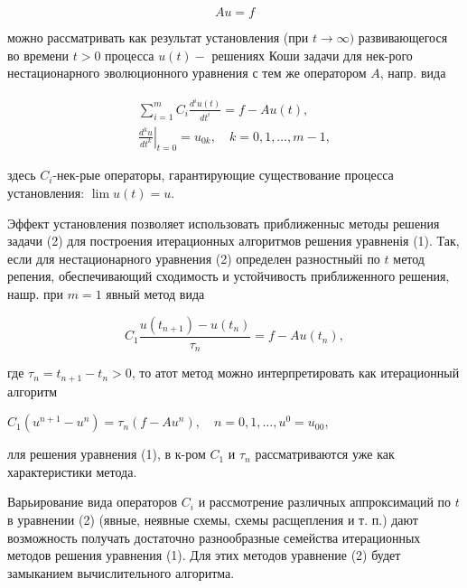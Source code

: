 \documentclass[10pt]{article}
\begin{document}
\[

A u=f

\]



можно рассматривать как результат установления (при $t \rightarrow \infty)$ развивающегося во времени $t>0$ процесса $u(t)-$ решениях Коши задачи для нек-рого нестационарного эволюционного уравнения с тем же оператором $A$, напр. вида



\[

\begin{gathered}

\sum_{i=1}^{m} C_{i} \frac{d^{i} u(t)}{d t^{i}}=f-A u(t), \\

\left.\frac{d^{k} u}{d t^{k}}\right|_{t=0}=u_{0 k}, \quad k=0,1, \ldots, m-1,

\end{gathered}

\]



здесь $C_{i}$-нек-рые операторы, гарантирующие существование процесса установления: $\lim u(t)=u$.



Эффект установления позволяет использовать приближенныс методы решения задачи (2) для построения итерационных алгоритмов решения уравненія (1). Так, если для нестационарного уравнения (2) определен разностныйі по $t$ метод репения, обеспечивающий сходимость и устойчивость приближенного решения, нашр. при $m=1$ явный метод вида



\[

C_{1} \frac{u\left(t_{n+1}\right)-u\left(t_{n}\right)}{\tau_{n}}=f-A u\left(t_{n}\right),

\]



где $\tau_{n}=t_{n+1}-t_{n}>0$, то атот метод можно интерпретировать как итерационный алгоритм



$C_{1}\left(u^{n+1}-u^{n}\right)=\tau_{n}\left(f-A u^{n}\right), \quad n=0,1, \ldots, u^{0}=u_{00}$,



лля решения уравнения (1), в к-ром $C_{1}$ и $\tau_{n}$ рассматриваются уже как характеристики метода.



Варьирование вида операторов $C_{i}$ и рассмотрение различных аппроксимаций по $t$ в уравнении (2) (явные, неявные схемы, схемы расщепления и т. п.) дают возможность получать достаточно разнообразные семейства итерационных методов решения уравнения (1). Для этих методов уравнение (2) будет замыканием вычислительного алгоритма.
\end{document}
